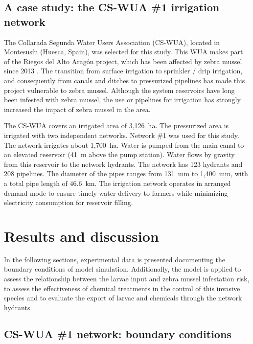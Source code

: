 \documentclass[review,authoryear]{elsarticle}
\begin{document}
\subsection{A case study: the CS-WUA \#1 irrigation network}

The Collarada Segunda Water Users Association (CS-WUA), located in Montesusín
(Huesca, Spain), was selected for this study. This WUA makes part of the Riegos
del Alto Aragón project, which has been affected by zebra mussel since 2013
\citep{MoralesHernandez18}. The transition from surface irrigation to sprinkler
/ drip irrigation, and consequently from canals and ditches to pressurized
pipelines has made this project vulnerable to zebra mussel. Although the system
reservoirs have long been infested with zebra mussel, the use or pipelines for
irrigation has strongly increased the impact of zebra mussel in the area.

The CS-WUA covers an irrigated area of 3,126~ha. The pressurized area is
irrigated with two independent networks. Network \#1 was used for this study.
The network irrigates about 1,700~ha. Water is pumped from the main canal to an
elevated reservoir (41~m above the pump station). Water flows by gravity from
this reservoir to the network hydrants. The network has 123 hydrants and 208
pipelines. The diameter of the pipes ranges from 131~mm to 1,400~mm, with a
total pipe length of 46.6~km. The irrigation network operates in arranged demand
mode \citep{Clemmens87} to ensure timely water delivery to farmers while
minimizing electricity consumption for reservoir filling.

\section{Results and discussion}

In the following sections, experimental data is presented documenting the
boundary conditions of model simulation. Additionally, the model is applied to
assess the relationship between the larvae input and zebra mussel infestation
risk, to assess the effectiveness of chemical treatments in the control of
this invasive species and to evaluate the export of larvae and chemicals through
the network hydrants.

\subsection{CS-WUA \#1 network: boundary conditions}
\end{document}
